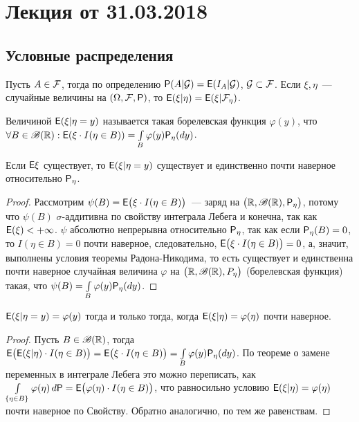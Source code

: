 \section{Лекция от 31.03.2018}
 \subsection{Условные распределения}
 \begin{definition}
 	Пусть $A \in \F$, тогда по определению $\P(A | \G) = \E( I_A | \G)$, $\G \subset \F$. Если $\xi, \eta$~--- случайные величины на $(\Omega, \F, \P)$, то $\E(\xi | \eta) = \E(\xi | \F_\eta)$.
 \end{definition}
 \begin{definition}
 	Величиной $\E (\xi | \eta = y)$ называется такая борелевская функция $\varphi(y)$, 
 	что $\forall B \in \B(\R): \E(\xi \cdot I(\eta \in B)) = 
 	\int\limits_B \varphi(y) \P_\eta (d y)$.
 \end{definition}
 \begin{lemma}
 	Если $\E \xi$ существует, то $\E( \xi | \eta = y)$ существует и единственно почти 
 	наверное относительно $\P_\eta$.
 	\begin{proof}
 		Рассмотрим $\psi(B) = \E \big( \xi \cdot I (\eta \in B) \big)$~--- заряд на 
 		$\big( \R, \B(\R), \P_\eta \big)$, потому что $\psi(B)$ $\sigma$-аддитивна по
 		 свойству интеграла Лебега и конечна, так как $\E(\xi) < +\infty$. 
 		 $\psi$ абсолютно непрерывна относительно $\P_\eta$, так как если 
 		 $\P_\eta(B) = 0$, то $I(\eta \in B) = 0$ почти наверное, следовательно, 
 		 $\E \big( \xi \cdot I (\eta \in B) \big) = 0$, а, значит, выполнены условия 
 		 теоремы Радона-Никодима, то есть существует и единственна почти наверное 
 		 случайная величина $\varphi$ на $\big( \R, \B(\R), P_\eta \big)$ 
 		 (борелевская функция) такая, что 
 		 $\psi(B) = \int\limits_B \varphi(y) \P_\eta(dy)$.
 	\end{proof}
 \end{lemma}
 \begin{lemma}
 	$\E ( \xi | \eta = y) = \varphi(y)$ тогда и только тогда, когда 
 	$\E(\xi | \eta) = \varphi(\eta)$ почти наверное.
 	\begin{proof}
 		Пусть $B \in \B(\R)$, тогда 
 		$\E \big( \E(\xi | \eta) \cdot I (\eta \in B) \big) = 
 		\E \big( \xi \cdot I(\eta \in B) \big) = \int\limits_B \varphi(y) \P_\eta(d y)$. 
 		По теореме о замене переменных в интеграле Лебега это можно переписать, как 
 		$\int\limits_{\{\eta \in B \}} \varphi(\eta) \, d \P = 
 		\E \big( \varphi(\eta) \cdot I (\eta \in B) \big)$, 
 		что равносильно условию $\E(\xi | \eta) = \varphi(\eta)$ 
 		почти наверное по Свойству. Обратно аналогично, по тем же равенствам.
 	\end{proof}
 \end{lemma}
